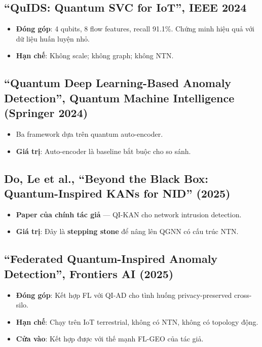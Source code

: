 \documentclass[11pt,a4paper]{article}
\begin{document}
\subsection{``QuIDS: Quantum SVC for IoT'', IEEE 2024}
\begin{itemize}
  \item \textbf{Đóng góp}: 4 qubits, 8 flow features, recall 91.1\%. Chứng minh hiệu quả với dữ liệu huấn luyện nhỏ.
  \item \textbf{Hạn chế}: Không scale; không graph; không NTN.
\end{itemize}

\subsection{``Quantum Deep Learning-Based Anomaly Detection'', Quantum Machine Intelligence (Springer 2024)}
\begin{itemize}
  \item Ba framework dựa trên quantum auto-encoder.
  \item \textbf{Giá trị}: Auto-encoder là baseline bắt buộc cho so sánh.
\end{itemize}

\subsection{Do, Le et al., ``Beyond the Black Box: Quantum-Inspired KANs for NID'' (2025)}
\begin{itemize}
  \item \textbf{Paper của chính tác giả} --- QI-KAN cho network intrusion detection.
  \item \textbf{Giá trị}: Đây là \textbf{stepping stone} để nâng lên QGNN có cấu trúc NTN.
\end{itemize}

\subsection{``Federated Quantum-Inspired Anomaly Detection'', Frontiers AI (2025)}
\begin{itemize}
  \item \textbf{Đóng góp}: Kết hợp FL với QI-AD cho tình huống privacy-preserved cross-silo.
  \item \textbf{Hạn chế}: Chạy trên IoT terrestrial, không có NTN, không có topology động.
  \item \textbf{Cửa vào}: Kết hợp được với thế mạnh FL-GEO của tác giả.
\end{itemize}
\end{document}
